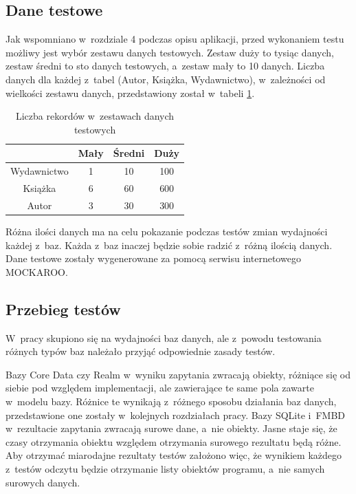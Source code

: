 \subsection{Dane testowe}

Jak wspomniano w~rozdziale  4 podczas opisu aplikacji, przed wykonaniem testu możliwy jest wybór zestawu danych testowych. Zestaw duży to tysiąc danych, zestaw średni to sto danych testowych, a~zestaw mały to 10 danych. Liczba danych dla każdej z~tabel (Autor, Książka, Wydawnictwo), w~zależności od wielkości zestawu danych, przedstawiony został w~tabeli \ref{tab: zestaw_danych}.

\begin{table}[h]
\centering
\caption {Liczba rekordów w~zestawach danych testowych}
\label{tab: zestaw_danych}
\begin{tabular}{|c|c|c|c|}
\hline
\multicolumn{1}{|l|}{} & Mały & Średni & Duży \\ \hline
Wydawnictwo            & 1    & 10     & 100  \\ \hline
Książka                & 6    & 60     & 600  \\ \hline
Autor                  & 3    & 30     & 300  \\ \hline
\end{tabular}
\end{table}

Różna ilości danych ma na celu pokazanie podczas testów zmian wydajności każdej z~baz. Każda z~baz inaczej będzie sobie radzić z~różną ilością danych. Dane testowe zostały wygenerowane za pomocą serwisu internetowego MOCKAROO. 

\subsection{Przebieg testów}

 W~pracy skupiono się na wydajności baz danych, ale z~powodu testowania różnych typów baz należało przyjąć odpowiednie zasady testów.\par 
Bazy Core Data czy Realm w~wyniku zapytania zwracają obiekty, różniące się od siebie pod względem implementacji, ale zawierające te same pola zawarte w~modelu bazy. Różnice te wynikają z~różnego sposobu działania baz danych, przedstawione one zostały w~kolejnych rozdziałach pracy. Bazy SQLite i~FMBD w~rezultacie zapytania zwracają surowe dane, a~nie obiekty. Jasne staje się, że czasy otrzymania obiektu względem otrzymania surowego rezultatu będą różne. Aby otrzymać miarodajne rezultaty testów założono więc, że wynikiem każdego z~testów odczytu będzie otrzymanie listy obiektów programu, a~nie samych surowych danych. 

